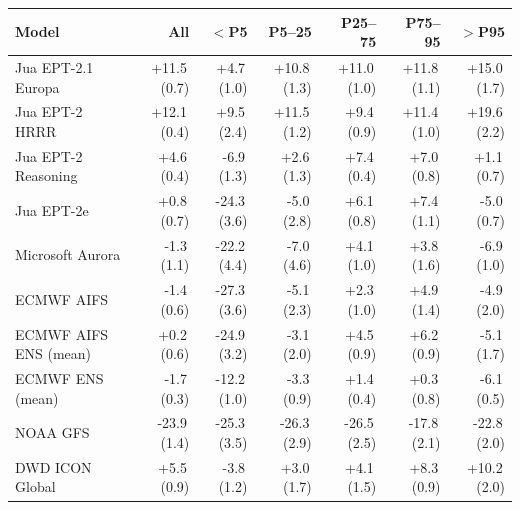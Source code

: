 \begin{tabular}{@{}lrrrrrr@{}}
\toprule
Model & All & $<$P5 & P5--25 & P25--75 & P75--95 & $>$P95 \\
\midrule
Jua EPT-2.1 Europa & +11.5\,(0.7) & +4.7\,(1.0) & +10.8\,(1.3) & +11.0\,(1.0) & +11.8\,(1.1) & +15.0\,(1.7) \\\addlinespace[0.35em]
Jua EPT-2 HRRR & +12.1\,(0.4) & +9.5\,(2.4) & +11.5\,(1.2) & +9.4\,(0.9) & +11.4\,(1.0) & +19.6\,(2.2) \\\addlinespace[0.35em]
Jua EPT-2 Reasoning & +4.6\,(0.4) & -6.9\,(1.3) & +2.6\,(1.3) & +7.4\,(0.4) & +7.0\,(0.8) & +1.1\,(0.7) \\\addlinespace[0.35em]
Jua EPT-2e & +0.8\,(0.7) & -24.3\,(3.6) & -5.0\,(2.8) & +6.1\,(0.8) & +7.4\,(1.1) & -5.0\,(0.7) \\\addlinespace[0.35em]
Microsoft Aurora & -1.3\,(1.1) & -22.2\,(4.4) & -7.0\,(4.6) & +4.1\,(1.0) & +3.8\,(1.6) & -6.9\,(1.0) \\\addlinespace[0.35em]
ECMWF AIFS & -1.4\,(0.6) & -27.3\,(3.6) & -5.1\,(2.3) & +2.3\,(1.0) & +4.9\,(1.4) & -4.9\,(2.0) \\\addlinespace[0.35em]
ECMWF AIFS ENS (mean) & +0.2\,(0.6) & -24.9\,(3.2) & -3.1\,(2.0) & +4.5\,(0.9) & +6.2\,(0.9) & -5.1\,(1.7) \\\addlinespace[0.35em]
ECMWF ENS (mean) & -1.7\,(0.3) & -12.2\,(1.0) & -3.3\,(0.9) & +1.4\,(0.4) & +0.3\,(0.8) & -6.1\,(0.5) \\\addlinespace[0.35em]
NOAA GFS & -23.9\,(1.4) & -25.3\,(3.5) & -26.3\,(2.9) & -26.5\,(2.5) & -17.8\,(2.1) & -22.8\,(2.0) \\\addlinespace[0.35em]
DWD ICON Global & +5.5\,(0.9) & -3.8\,(1.2) & +3.0\,(1.7) & +4.1\,(1.5) & +8.3\,(0.9) & +10.2\,(2.0) \\
\bottomrule
\end{tabular}

